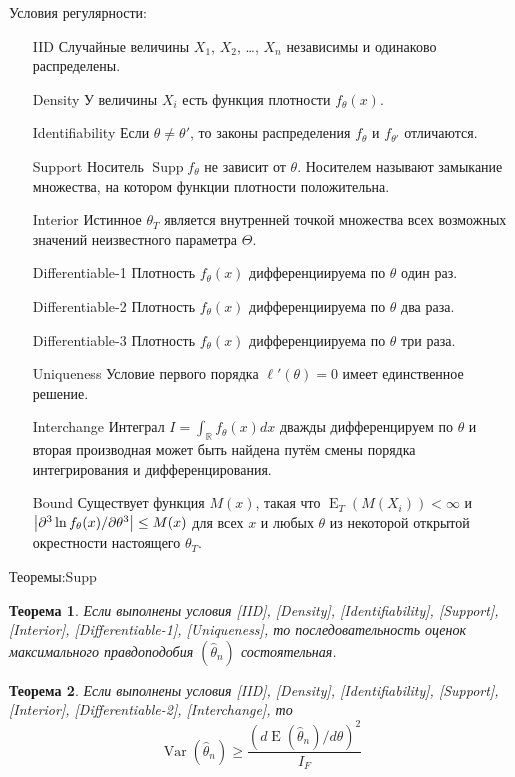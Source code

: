 \documentclass[12pt, a4paper]{article}
\DeclareMathOperator{\Var}{Var}
\DeclareMathOperator{\E}{E}
\DeclareMathOperator{\Supp}{Supp}
\newcommand{\RR}{\mathbb{R}}
\newtheorem{theorem}{Теорема}
\begin{document}
Условия регулярности:
\begin{itemize}[align=parleft, leftmargin=-1cm, itemindent=7cm, labelsep=2cm, labelwidth=4cm]
  \item [IID] Случайные величины $X_1$, $X_2$, \ldots, $X_n$ независимы и одинаково распределены.
  \item [Density] У величины $X_i$ есть функция плотности $f_{\theta}(x)$.
  \item [Identifiability] Если $\theta \neq \theta'$, то законы распределения $f_\theta$ и $f_{\theta'}$ отличаются.
  \item [Support] Носитель $\Supp f_\theta$ не зависит от $\theta$. 
  Носителем называют замыкание множества, на котором функции плотности положительна.
  \item [Interior] Истинное $\theta_T$ является внутренней точкой множества всех возможных значений неизвестного параметра $\Theta$.
  \item [Differentiable-1] Плотность $f_\theta(x)$ дифференциируема по $\theta$ один раз.
  \item [Differentiable-2] Плотность $f_\theta(x)$ дифференциируема по $\theta$ два раза.
  \item [Differentiable-3] Плотность $f_\theta(x)$ дифференциируема по $\theta$ три раза.
\item [Uniqueness] Условие первого порядка $\ell'(\theta)=0$ имеет единственное решение. 
\item [Interchange] Интеграл $I = \int_{\RR} f_\theta (x) dx$ дважды дифференцируем по $\theta$ и 
вторая производная может быть найдена путём смены порядка интегрирования и дифференцирования.
\item [Bound] Существует функция $M(x)$, такая что 
$\E_T(M(X_i)) < \infty$ и $\abs{\partial^3 \ln f_\theta(x)/\partial \theta^3} \leq M(x)$ для всех $x$ 
и любых $\theta$ из некоторой открытой окрестности настоящего $\theta_T$.
\end{itemize}



Теоремы:Supp

\begin{theorem}
  Если выполнены условия [IID], [Density], [Identifiability], [Support], [Interior], [Differentiable-1], [Uniqueness], то 
  последовательность оценок максимального правдоподобия $(\hat \theta_n)$ состоятельная. 
\end{theorem}

\begin{theorem}
  Если выполнены условия [IID], [Density], [Identifiability], [Support], [Interior], [Differentiable-2], [Interchange], то 
  \[
  \Var(\hat \theta_n) \geq \frac{(d \E(\hat\theta_n) / d\theta )^2}{I_F}  
  \]
\end{theorem}
\end{document}
